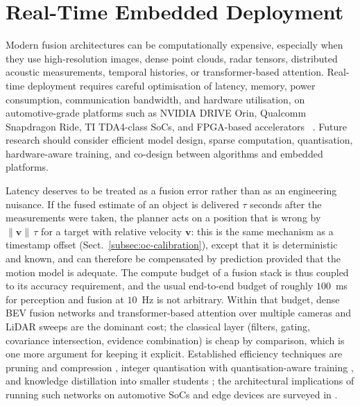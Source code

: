 \section{Real-Time Embedded Deployment}
\label{subsec:oc-embedded}

Modern fusion architectures can be computationally expensive, especially when they use high-resolution images, dense point clouds, radar tensors, distributed acoustic measurements, temporal histories, or transformer-based attention. Real-time deployment requires careful optimisation of latency, memory, power consumption, communication bandwidth, and hardware utilisation, on automotive-grade platforms such as NVIDIA DRIVE Orin, Qualcomm Snapdragon Ride, TI TDA4-class SoCs, and FPGA-based accelerators%
~\cite{lin2018_architectural,liu2019_edge_computing,sze2017_efficient}.
Future research should consider efficient model design, sparse computation, quantisation, hardware-aware training, and co-design between algorithms and embedded platforms.

Latency deserves to be treated as a fusion error rather than as an engineering nuisance. If the fused estimate of an object is delivered $\tau$ seconds after the measurements were taken, the planner acts on a position that is wrong by $\lVert\mathbf{v}\rVert\,\tau$ for a target with relative velocity $\mathbf{v}$: this is the same mechanism as a timestamp offset (Sect.~\ref{subsec:oc-calibration}), except that it is deterministic and known, and can therefore be compensated by prediction provided that the motion model is adequate. The compute budget of a fusion stack is thus coupled to its accuracy requirement, and the usual end-to-end budget of roughly $100$~ms for perception and fusion at $10$~Hz is not arbitrary. Within that budget, dense BEV fusion networks and transformer-based attention over multiple cameras and LiDAR sweeps are the dominant cost; the classical layer (filters, gating, covariance intersection, evidence combination) is cheap by comparison, which is one more argument for keeping it explicit. Established efficiency techniques are pruning and compression \cite{han2016_deep_compression}, integer quantisation with quantisation-aware training \cite{jacob2018_quantization}, and knowledge distillation into smaller students \cite{hinton2015_distillation}; the architectural implications of running such networks on automotive SoCs and edge devices are surveyed in \cite{lin2018_architectural,liu2019_edge_computing,sze2017_efficient}.

